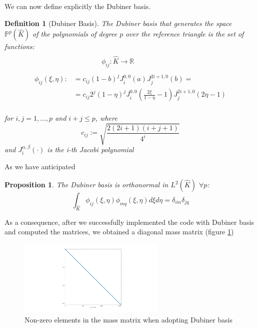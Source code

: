 \documentclass[a4paper,11pt]{article}
\newtheorem{definition}{Definition}
\newtheorem{prop}{Proposition}
\begin{document}
    \noindent We can now define explicitly the Dubiner basis.
    \begin{definition}[Dubiner Basis] \label{dubiner}
    The Dubiner basis that generates the space $\mathbb{P}^p(\hat{K})$ of the polynomials of degree $p$ over the reference triangle is the set of functions:
    \begin{equation}
    \begin{split}
    \\
    & \quad \quad\quad  \quad \phi_{ij}: \hat{K} \rightarrow \mathbb{R} \\ \\
    \phi_{ij}(\xi,\eta) :&= c_{ij}(1-b)^j J_i^{0,0}(a) J_j^{2i+1,0}(b)=
    \\&=c_{ij} 2^j (1-\eta)^j J_i^{0,0}(\frac{2\xi}{1-\eta}-1) J_j^{2i+1,0} (2\eta-1) 
    \end{split}
    \end{equation}
    \vspace{3mm} \\
    for $i,j=1,\dots,p$ and $i+j \le p$, where
    \begin{equation}
    c_{ij} := \sqrt{\frac{2(2i+1)(i+j+1)}{4^i}}
    \end{equation}
    and $J_i^{\alpha,\beta}(\cdot)$ is the i-th Jacobi polynomial
    \end{definition}
    
    \vspace{5mm}
    \noindent As we have anticipated \cite{sherwin}
    \begin{prop}\label{l2_ortho}
    The Dubiner basis is orthonormal in $L^2(\hat{K})$ $\forall p$:
    \begin{equation}
    \int_{\hat{K}}{\phi_{ij}(\xi,\eta)\phi_{mq}(\xi,\eta) d\xi d\eta}=\delta_{im}\delta_{jq}
    \end{equation}
    \end{prop}
    \vspace{4mm}
    \noindent As a consequence, after we successfully implemented the code with Dubiner basis and computed the matrices, we obtained a diagonal mass matrix (figure \ref{mass})
    
    \begin{figure}[ht]
    \begin{center}
    \includegraphics[width = 7cm]{./mass_dubiner.jpg}
    	\caption{Non-zero elements in the mass matrix when adopting Dubiner basis}
    	\label{mass}
    \end{center}
    \end{figure}
\end{document}
